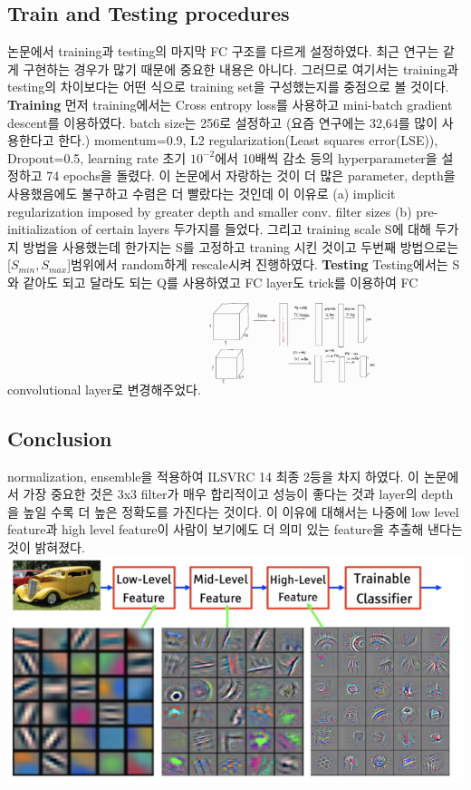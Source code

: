 \documentclass[extendedabs]{bmvc2k}
\begin{document}
\subsection{Train and Testing procedures}
 논문에서 training과 testing의 마지막 FC 구조를 다르게 설정하였다. 최근 연구는 같게 구현하는 경우가 많기 때문에 중요한 내용은 아니다. 그러므로 여기서는 training과 testing의
차이보다는 어떤 식으로 training set을 구성했는지를 중점으로 볼 것이다.
\newline  \textbf{Training}
 먼저 training에서는 Cross entropy loss를 사용하고 mini-batch gradient descent를 이용하였다. batch size는 256로 설정하고 (요즘 연구에는 32,64를 많이 사용한다고 한다.)
 momentum=0.9, L2 regularization(Least squares error(LSE)), Dropout=0.5, learning rate 초기 $10^{-2}$에서 10배씩 감소 등의 hyperparameter을 설정하고 74 epochs을 돌렸다.
 이 논문에서 자랑하는 것이 더 많은 parameter, depth을 사용했음에도 불구하고 수렴은 더 빨랐다는 것인데 이 이유로 (a) implicit regularization imposed by greater depth and smaller conv. filter sizes 
 (b) pre-initialization of certain layers 두가지를 들었다. 그리고 training scale S에 대해 두가지 방법을 사용했는데 한가지는 S를 고정하고 traning 시킨 것이고 두번째 방법으로는
 [$S_{min}, S_{max}$]범위에서 random하게 rescale시켜 진행하였다.
\newline  \textbf{Testing}
 Testing에서는 S와 같아도 되고 달라도 되는 Q를 사용하였고 FC layer도 trick를 이용하여 FC convolutional layer로 변경해주었다.
\newline  \includegraphics[width=5cm, height=3cm]{images/04_VGG.png}

\subsection{Conclusion}
 normalization, ensemble을 적용하여 ILSVRC 14 최종 2등을 차지 하였다. 이 논문에서 가장 중요한 것은 3x3 filter가 매우 합리적이고 성능이 좋다는 것과 layer의 depth을 높일 수록
 더 높은 정확도를 가진다는 것이다. 이 이유에 대해서는 나중에 low level feature과 high level feature이 사람이 보기에도 더 의미 있는 feature을 추출해 낸다는 것이 밝혀졌다. 
 \newline  \includegraphics[width=\linewidth]{images/08_residual.PNG}
\end{document}
